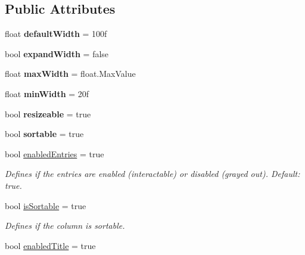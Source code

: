 \subsection*{Public Attributes}
\begin{DoxyCompactItemize}
\item 
\mbox{\label{class_table_column_entry_a08139cc094136d8c57b12fd6b95b31de}} 
float {\bfseries default\+Width} = 100f
\item 
\mbox{\label{class_table_column_entry_a77f73236638c69a797520dd45a72909f}} 
bool {\bfseries expand\+Width} = false
\item 
\mbox{\label{class_table_column_entry_ae173513141ac9b369aeda1a505f71037}} 
float {\bfseries max\+Width} = float.\+Max\+Value
\item 
\mbox{\label{class_table_column_entry_a042c46023ba0ecda8ab5dc09a583f1b8}} 
float {\bfseries min\+Width} = 20f
\item 
\mbox{\label{class_table_column_entry_a1512e062e4fc3b3cfdc134a2a984acc0}} 
bool {\bfseries resizeable} = true
\item 
\mbox{\label{class_table_column_entry_ae6cfc37ad06ec5a1014b7ad2de6152c5}} 
bool {\bfseries sortable} = true
\item 
bool \mbox{\hyperlink{class_table_column_entry_a67b708efeb53404a92acd14d3d835be5}{enabled\+Entries}} = true
\begin{DoxyCompactList}\small\item\em Defines if the entries are enabled (interactable) or disabled (grayed out). Default\+: true. \end{DoxyCompactList}\item 
bool \mbox{\hyperlink{class_table_column_entry_ac15f6f79fd208e7d3cf25d38e94c2b24}{is\+Sortable}} = true
\begin{DoxyCompactList}\small\item\em Defines if the column is sortable. \end{DoxyCompactList}\item 
bool \mbox{\hyperlink{class_table_column_entry_ad861d6d58bae1518e32a3a9351effbb7}{enabled\+Title}} = true

\end{DoxyCompactItemize}
